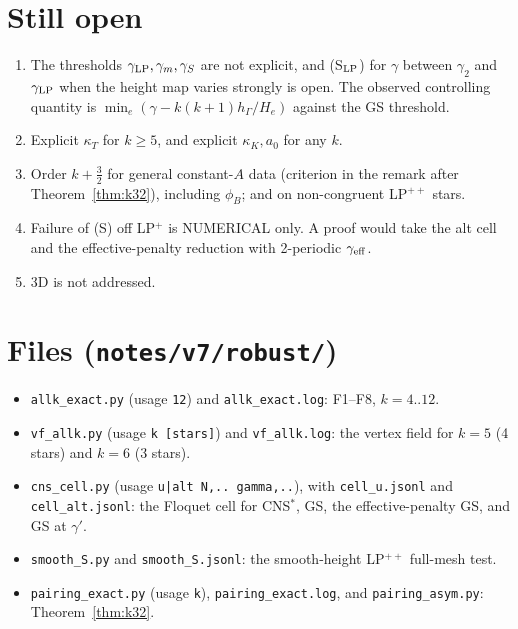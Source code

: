 \documentclass[11pt]{article}
\theoremstyle{remark}
\newcommand{\hG}{h_\Gamma}
\begin{document}
\section{Still open}
\begin{enumerate}
\item The thresholds $\gamma_{\rm LP},\gamma_m,\gamma_S$ are not explicit, and (S$_{\rm LP}$) for $\gamma$ between $\gamma_2$ and $\gamma_{\rm LP}$ when the height map varies strongly is open.
 The observed controlling quantity is $\min_e(\gamma-k(k+1)\hG/H_e)$ against the GS threshold.
\item Explicit $\kappa_T$ for $k\ge5$, and explicit $\kappa_K,a_0$ for any $k$.
\item Order $k+\frac32$ for general constant-$A$ data (criterion in the remark after Theorem~\ref{thm:k32}), including $\phi_B$; and on non-congruent LP$^{++}$ stars.
\item Failure of (S) off LP$^+$ is NUMERICAL only. A proof would take the alt cell and the effective-penalty reduction with 2-periodic $\gamma_{\rm eff}$.
\item 3D is not addressed.
\end{enumerate}

\section*{Files (\texttt{notes/v7/robust/})}
\begin{itemize}
\item \texttt{allk\_exact.py} (usage \texttt{12}) and \texttt{allk\_exact.log}: F1--F8, $k=4..12$.
\item \texttt{vf\_allk.py} (usage \texttt{k [stars]}) and \texttt{vf\_allk.log}: the vertex field for $k=5$ (4 stars) and $k=6$ (3 stars).
\item \texttt{cns\_cell.py} (usage \texttt{u|alt N,.. gamma,..}), with \texttt{cell\_u.jsonl} and \texttt{cell\_alt.jsonl}: the Floquet cell for CNS$^\ast$, GS, the effective-penalty GS,
and GS at $\gamma'$.
\item \texttt{smooth\_S.py} and \texttt{smooth\_S.jsonl}: the smooth-height LP$^{++}$ full-mesh test.
\item \texttt{pairing\_exact.py} (usage \texttt{k}), \texttt{pairing\_exact.log}, and \texttt{pairing\_asym.py}: Theorem~\ref{thm:k32}.
\end{itemize}
\end{document}
